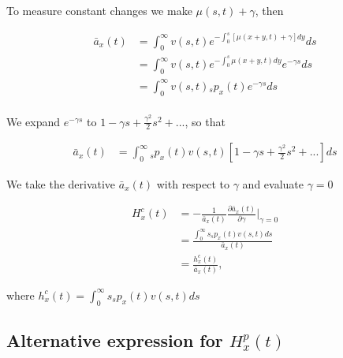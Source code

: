 \documentclass[12pt]{article}
\begin{document}
To measure constant changes we make $\mu(s,t)+\gamma$, then

\begin{equation}\label{eq:EntropyConst1}
\begin{split}
\bar{a}_{x}(t) &= \int_0^\infty{v}(s,t) e^{-\int_{0}^{s} [\mu(x+y,t)+\gamma]dy}ds \\
&= \int_0^\infty {v}(s,t)e^{-\int_{0}^{s} \mu(x+y,t)dy} e^{-\gamma s}ds \\
&= \int_0^\infty {v}(s,t){}_sp_x(t) e^{-\gamma s}ds \\
\end{split}
\end{equation}

We expand $e^{-\gamma s}$ to $1-\gamma s+\frac{\gamma^2}{2} s^{2} +...$, so that


\begin{equation}\label{eq:EntropyConst2}
\begin{split}
\bar{a}_{x}(t) &= \int_0^\infty {}_sp_x(t) {v}(s,t)[1-\gamma s+\frac{\gamma^2}{2} s^{2} +...]ds
\end{split}
\end{equation}

We take the derivative $\bar{a}_{x}(t)$ with respect to $\gamma$ and evaluate $\gamma=0$


\begin{equation}\label{eq:EntropyConst3}
\begin{split}
{H}^{c}_x(t)&=-\frac{1}{\bar{a}_x(t)}\frac{\partial \bar{a}_x(t)}{\partial \gamma} \bigg\rvert_{\gamma=0}\\
&= \frac{\int_0^\infty s {}_sp_x(t) {v}(s,t)ds}{\bar{a}_x(t)} \\
&= \frac{{h}^{c}_x(t)}{\bar{a}_x(t)},
\end{split}
\end{equation}

where ${h}^{c}_x(t)=\int_0^\infty s {}_sp_x(t) {v}(s,t)ds$



\subsection{Alternative expression for ${H}^{p}_{x}(t)$}
\end{document}
